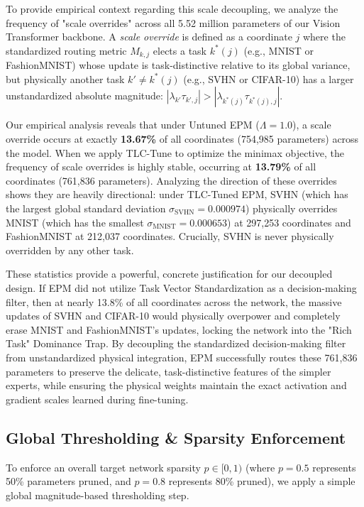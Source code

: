To provide empirical context regarding this scale decoupling, we analyze the frequency of "scale overrides" across all 5.52 million parameters of our Vision Transformer backbone. A \emph{scale override} is defined as a coordinate $j$ where the standardized routing metric $M_{k, j}$ elects a task $k^*(j)$ (e.g., MNIST or FashionMNIST) whose update is task-distinctive relative to its global variance, but physically another task $k' \neq k^*(j)$ (e.g., SVHN or CIFAR-10) has a larger unstandardized absolute magnitude: $|\lambda_{k'} \tau_{k', j}| > |\lambda_{k^*(j)} \tau_{k^*(j), j}|$. 

Our empirical analysis reveals that under Untuned EPM ($\Lambda = \mathbf{1.0}$), a scale override occurs at exactly \textbf{13.67\%} of all coordinates (754,985 parameters) across the model. When we apply TLC-Tune to optimize the minimax objective, the frequency of scale overrides is highly stable, occurring at \textbf{13.79\%} of all coordinates (761,836 parameters). Analyzing the direction of these overrides shows they are heavily directional: under TLC-Tuned EPM, SVHN (which has the largest global standard deviation $\sigma_{\text{SVHN}} = 0.000974$) physically overrides MNIST (which has the smallest $\sigma_{\text{MNIST}} = 0.000653$) at 297,253 coordinates and FashionMNIST at 212,037 coordinates. Crucially, SVHN is never physically overridden by any other task. 

These statistics provide a powerful, concrete justification for our decoupled design. If EPM did not utilize Task Vector Standardization as a decision-making filter, then at nearly 13.8\% of all coordinates across the network, the massive updates of SVHN and CIFAR-10 would physically overpower and completely erase MNIST and FashionMNIST's updates, locking the network into the "Rich Task" Dominance Trap. By decoupling the standardized decision-making filter from unstandardized physical integration, EPM successfully routes these 761,836 parameters to preserve the delicate, task-distinctive features of the simpler experts, while ensuring the physical weights maintain the exact activation and gradient scales learned during fine-tuning.

\subsection{Global Thresholding \& Sparsity Enforcement}
To enforce an overall target network sparsity $p \in [0, 1)$ (where $p=0.5$ represents 50\% parameters pruned, and $p=0.8$ represents 80\% pruned), we apply a simple global magnitude-based thresholding step.

